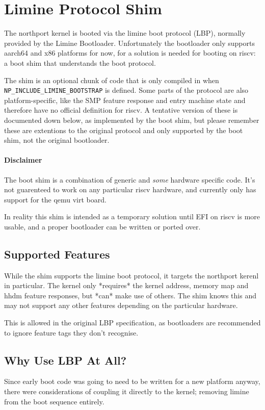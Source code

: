 \section{Limine Protocol Shim}
The northport kernel is booted via the limine boot protocol (LBP), normally provided by the Limine Bootloader. Unfortunately the bootloader only supports aarch64 and x86 platforms for now, for a solution is needed for booting on riscv: a boot shim that understands the boot protocol.

The shim is an optional chunk of code that is only compiled in when \verb|NP_INCLUDE_LIMINE_BOOTSTRAP| is defined. Some parts of the protocol are also platform-specific, like the SMP feature response and entry machine state and therefore have no official definition for riscv. A tentative version of these is documented down below, as implemented by the boot shim, but please remember these are extentions to the original protocol and only supported by the boot shim, not the original bootloader.

\paragraph{Disclaimer}
The boot shim is a combination of generic and \textit{some} hardware specific code. It's not guarenteed to work on any particular riscv hardware, and currently only has support for the qemu virt board.

In reality this shim is intended as a temporary solution until EFI on riscv is more usable, and a proper bootloader can be written or ported over. 

\subsection{Supported Features}
While the shim supports the limine boot protocol, it targets the northport kerenl in particular. The kernel only *requires* the kernel address, memory map and hhdm feature responses, but *can* make use of others. The shim knows this and may not support any other features depending on the particular hardware. 

This is allowed in the original LBP specification, as bootloaders are recommended to ignore feature tags they don't recognise.

\subsection{Why Use LBP At All?}
Since early boot code was going to need to be written for a new platform anyway, there were considerations of coupling it directly to the kernel; removing limine from the boot sequence entirely.


